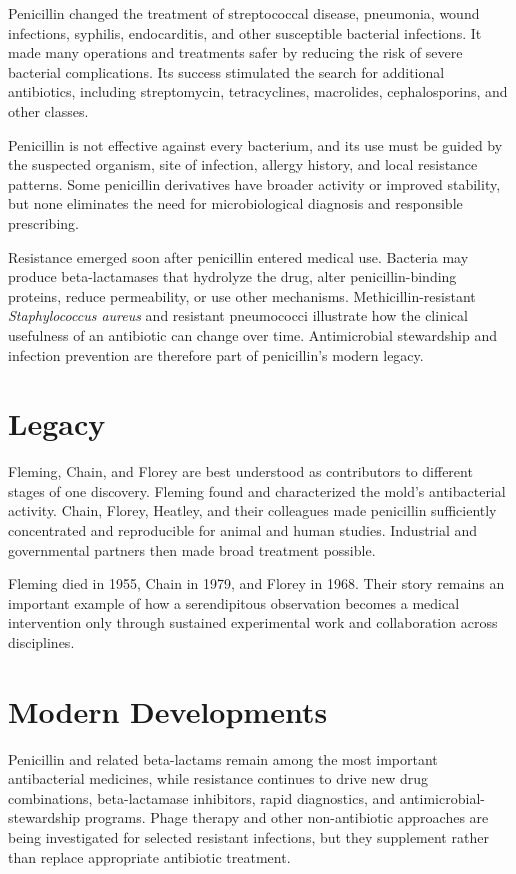 Penicillin changed the treatment of streptococcal disease, pneumonia, wound infections, syphilis, endocarditis, and other susceptible bacterial infections. It made many operations and treatments safer by reducing the risk of severe bacterial complications. Its success stimulated the search for additional antibiotics, including streptomycin, tetracyclines, macrolides, cephalosporins, and other classes.

Penicillin is not effective against every bacterium, and its use must be guided by the suspected organism, site of infection, allergy history, and local resistance patterns. Some penicillin derivatives have broader activity or improved stability, but none eliminates the need for microbiological diagnosis and responsible prescribing.

Resistance emerged soon after penicillin entered medical use. Bacteria may produce beta-lactamases that hydrolyze the drug, alter penicillin-binding proteins, reduce permeability, or use other mechanisms. Methicillin-resistant \textit{Staphylococcus aureus} and resistant pneumococci illustrate how the clinical usefulness of an antibiotic can change over time. Antimicrobial stewardship and infection prevention are therefore part of penicillin's modern legacy.

\section{Legacy}

Fleming, Chain, and Florey are best understood as contributors to different stages of one discovery. Fleming found and characterized the mold's antibacterial activity. Chain, Florey, Heatley, and their colleagues made penicillin sufficiently concentrated and reproducible for animal and human studies. Industrial and governmental partners then made broad treatment possible.

Fleming died in 1955, Chain in 1979, and Florey in 1968. Their story remains an important example of how a serendipitous observation becomes a medical intervention only through sustained experimental work and collaboration across disciplines.

\section{Modern Developments}

Penicillin and related beta-lactams remain among the most important antibacterial medicines, while resistance continues to drive new drug combinations, beta-lactamase inhibitors, rapid diagnostics, and antimicrobial-stewardship programs. Phage therapy and other non-antibiotic approaches are being investigated for selected resistant infections, but they supplement rather than replace appropriate antibiotic treatment.

